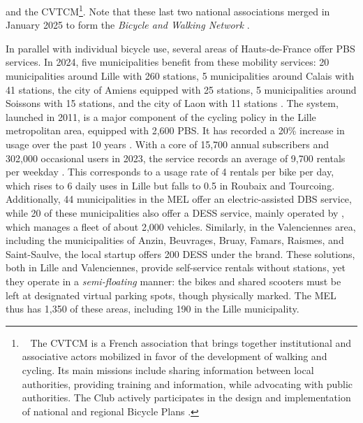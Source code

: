 \begin{refsegment}
{} and the \acrfull{CVTCM}\footnote{~
    The \acrfull{CVTCM} is a French association that brings together institutional and associative actors mobilized in favor of the development of walking and cycling. Its main missions include sharing information between local authorities, providing training and information, while advocating with public authorities. The Club actively participates in the design and implementation of national and regional Bicycle Plans \textcolor{blue}{\autocite{club_des_villes_et_territoires_cyclables_et_marchables_club_2024}}.
}. Note that these last two national associations merged in January 2025 to form the \textsl{Bicycle and Walking Network} \textcolor{blue}{\autocite{club_des_villes_et_territoires_cyclables_et_marchables_club_2024}}.%

In parallel with individual bicycle use, several areas of Hauts-de-France offer \acrshort{PBS} services. In 2024, five municipalities benefit from these mobility services: 20 municipalities around Lille with 260 stations, 5 municipalities around Calais with 41 stations, the city of Amiens equipped with 25 stations, 5 municipalities around Soissons with 15 stations, and the city of Laon with 11 stations \textcolor{blue}{\autocite[41]{region_hauts-de-france_plan_2023}}. The  system, launched in 2011, is a major component of the cycling policy in the Lille metropolitan area, equipped with 2,600 \acrshort{PBS}. It has recorded a 20\% increase in usage over the past 10 years \textcolor{blue}{\autocite[1]{metropole_europeenne_de_lille_vlille_2021}}. With a core of 15,700 annual subscribers and 302,000 occasional users in 2023, the service records an average of 9,700 rentals per weekday \textcolor{blue}{\autocite{berges_plus_2023}}. This corresponds to a usage rate of 4 rentals per bike per day, which rises to 6 daily uses in Lille but falls to 0.5 in Roubaix and Tourcoing. Additionally, 44 municipalities in the \acrshort{MEL} offer an electric-assisted \acrshort{DBS} service, while 20 of these municipalities also offer a \acrshort{DESS} service, mainly operated by , which manages a fleet of about 2,000 vehicles. Similarly, in the Valenciennes area, including the municipalities of Anzin, Beuvrages, Bruay, Famars, Raismes, and Saint-Saulve, the local startup  offers 200 \acrshort{DESS} under the  brand. These solutions, both in Lille and Valenciennes, provide self-service rentals without stations, yet they operate in a \textsl{semi-floating} manner: the bikes and shared scooters must be left at designated virtual parking spots, though physically marked. The \acrshort{MEL} thus has 1,350 of these areas, including 190 in the Lille municipality.%


\end{refsegment}
